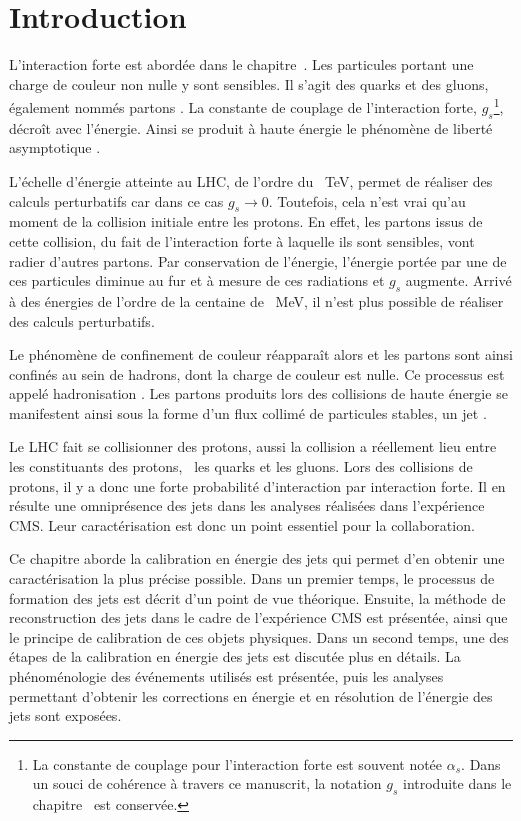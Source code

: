 \section{Introduction}\label{chapter-JERC-section-introduction}
L'interaction forte est abordée dans le chapitre~.
Les particules portant une charge de couleur non nulle y sont sensibles.
Il s'agit des quarks et des gluons, également nommés \og partons \fg.
La constante de couplage de l'interaction forte, $g_s$\footnote{La constante de couplage pour l'interaction forte est souvent notée $\alpha_s$. Dans un souci de cohérence à travers ce manuscrit, la notation $g_s$ introduite dans le chapitre~ est conservée.}, décroît  avec l'énergie.
Ainsi se produit à haute énergie le phénomène de \og liberté asymptotique \fg.
\par L'échelle d'énergie atteinte au LHC, de l'ordre du \SI{}{\TeV}, permet de réaliser des calculs perturbatifs car dans ce cas $g_s \to 0$. Toutefois, cela n'est vrai qu'au moment de la collision initiale entre les protons.
En effet, les partons issus de cette collision, du fait de l'interaction forte à laquelle ils sont sensibles, vont radier d'autres partons.
Par conservation de l'énergie, l'énergie portée par une de ces particules diminue au fur et à mesure de ces radiations et $g_s$ augmente.
Arrivé à des énergies de l'ordre de la centaine de \SI{}{\MeV}, il n'est plus possible de réaliser des calculs perturbatifs.
\par Le phénomène de confinement de couleur réapparaît alors et les partons sont ainsi confinés au sein de hadrons, dont la charge de couleur est nulle.
Ce processus est appelé \og hadronisation \fg.
Les partons produits lors des collisions de haute énergie se manifestent ainsi sous la forme d'un flux collimé de particules stables, un \og jet \fg.
\par Le LHC fait se collisionner des protons, aussi la collision a réellement lieu entre les constituants des protons, \ie\ les quarks et les gluons. Lors des collisions de protons, il y a donc une forte probabilité d'interaction par interaction forte. Il en résulte une omniprésence des jets dans les analyses réalisées dans l'expérience CMS. Leur caractérisation est donc un point essentiel pour la collaboration.
\par Ce chapitre aborde la calibration en énergie des jets qui permet d'en obtenir une caractérisation la plus précise possible.
Dans un premier temps, le processus de formation des jets est décrit d'un point de vue théorique. Ensuite, la méthode de reconstruction des jets dans le cadre de l'expérience CMS est présentée, ainsi que le principe de calibration de ces objets physiques.
Dans un second temps, une des étapes de la calibration en énergie des jets est discutée plus en détails. La phénoménologie des événements utilisés est présentée, puis les analyses permettant d'obtenir les corrections en énergie et en résolution de l'énergie des jets sont exposées.